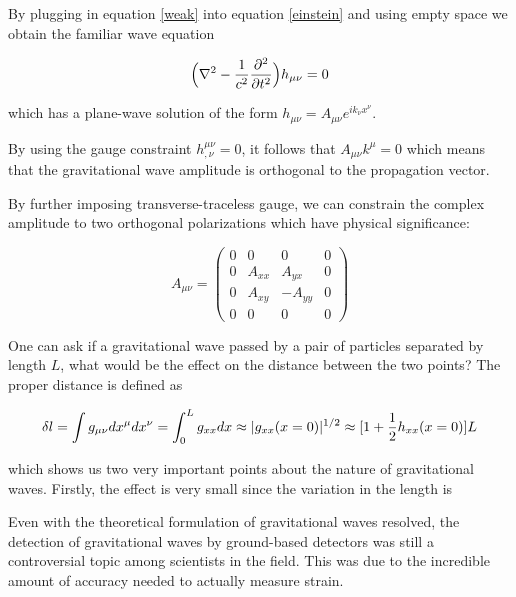 \documentclass[10pt,a4paper]{book}
\begin{document}
	By plugging in equation \ref{weak} into equation \ref{einstein} and using empty space we obtain the familiar wave equation
	
	\begin{equation} \label{wave}
	\Big(\nabla^2 - \frac{1}{c^2} \pdv[2]{t} \Big) h_{\mu \nu}  = 0
	\end{equation}

	which has a plane-wave solution of the form $h_{\mu \nu} = A_{\mu \nu} e^{ik_{\nu} x^{\nu}}$. 
	
	By using the gauge constraint $h^{\mu \nu}_{,\nu} = 0$, it follows that $A_{\mu \nu} k^{\mu} = 0$ which means that the gravitational wave amplitude is orthogonal to the propagation vector.
	
	By further imposing transverse-traceless gauge, we can constrain the complex amplitude to two orthogonal polarizations which have physical significance:
	
	\begin{equation} \label{gwamp}
	A_{\mu \nu} = 
	\begin{pmatrix}
			0 &    0   &  0      & 0 
		 \\ 0 & A_{xx} &  A_{yx} & 0
		 \\ 0 & A_{xy} & -A_{yy} & 0
		 \\ 0 &    0   &  0      & 0
	\end{pmatrix}
	\end{equation}

	One can ask if a gravitational wave passed by a pair of particles separated by length $L$, what would be the effect on the distance between the two points?  The proper distance is defined as
	
	\begin{equation}\label{propdist}
	\delta l
	= \int{g_{\mu \nu} dx^{\mu} dx^{\nu}} \\
	= \int_{0}^{L}{g_{xx} {d}x}\\
	\approx |g_{xx}(x=0)|^{1/2}\\
	\approx [ 1 + \frac{1}{2} h_{xx}(x=0)] L
	\end{equation} 
	
	which shows us two very important points about the nature of gravitational waves.  Firstly, the effect is very small since the variation in the length is 
	
	Even with the theoretical formulation of gravitational waves resolved, the detection of gravitational waves by ground-based detectors was still a controversial topic among scientists in the field.  This was due to the incredible amount of accuracy needed to actually measure strain. 
	
\end{document}
